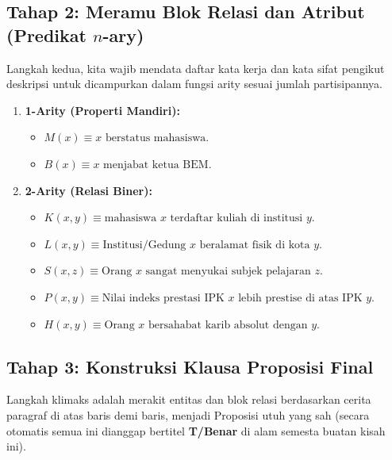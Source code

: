\subsection{Tahap 2: Meramu Blok Relasi dan Atribut (Predikat $n$-ary)}

Langkah kedua, kita wajib mendata daftar kata kerja dan kata sifat pengikut deskripsi untuk dicampurkan dalam fungsi arity sesuai jumlah partisipannya.
\begin{enumerate}
    \item \textbf{1-Arity (Properti Mandiri):}
    \begin{itemize}
        \item $M(x) \equiv x \text{ berstatus mahasiswa}$.
        \item $B(x) \equiv x \text{ menjabat ketua BEM}$.
    \end{itemize}
    \item \textbf{2-Arity (Relasi Biner):}
    \begin{itemize}
        \item $K(x, y) \equiv \text{mahasiswa } x \text{ terdaftar kuliah di institusi } y$.
        \item $L(x, y) \equiv \text{Institusi/Gedung } x \text{ beralamat fisik di kota } y$.
        \item $S(x, z) \equiv \text{Orang } x \text{ sangat menyukai subjek pelajaran } z$.
        \item $P(x, y) \equiv \text{Nilai indeks prestasi IPK } x \text{ lebih prestise di atas IPK } y$.
        \item $H(x, y) \equiv \text{Orang } x \text{ bersahabat karib absolut dengan } y$.
    \end{itemize}
\end{enumerate}

\subsection{Tahap 3: Konstruksi Klausa Proposisi Final}

Langkah klimaks adalah merakit entitas dan blok relasi berdasarkan cerita paragraf di atas baris demi baris, menjadi Proposisi utuh yang sah (secara otomatis semua ini dianggap bertitel \textbf{T/Benar} di alam semesta buatan kisah ini).

